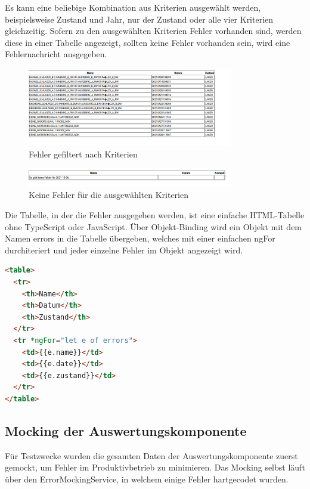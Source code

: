Es kann eine beliebige Kombination aus Kriterien ausgewählt werden, beispielsweise Zustand und Jahr, nur der Zustand oder alle vier 
Kriterien gleichzeitig. Sofern zu den ausgewählten Kriterien Fehler vorhanden sind, werden diese in einer Tabelle angezeigt, sollten 
keine Fehler vorhanden sein, wird eine Fehlernachricht ausgegeben.
\begin{figure}[H]
    \centering
    \includegraphics[width=0.80\textwidth]{pics/errors.PNG}
    \caption{Fehler gefiltert nach Kriterien}
    \label{fig:errors}
\end{figure}
\begin{figure}[H]
    \centering
    \includegraphics[width=0.80\textwidth]{pics/noerror.PNG}
    \caption{Keine Fehler für die ausgewählten Kriterien}
    \label{fig:noerrors}
\end{figure}

Die Tabelle, in der die Fehler ausgegeben werden, ist eine einfache HTML-Tabelle ohne TypeScript oder JavaScript. Über Objekt-Binding 
wird ein Objekt mit dem Namen errors in die Tabelle übergeben, welches mit einer einfachen ngFor durchiteriert und jeder einzelne Fehler
im Objekt angezeigt wird.

\begin{lstlisting}[language=HTML, caption={HTML-Code der Fehlertabelle}]
<table>
  <tr>
    <th>Name</th>
    <th>Datum</th>
    <th>Zustand</th>
  </tr>
  <tr *ngFor="let e of errors">
    <td>{{e.name}}</td>
    <td>{{e.date}}</td>
    <td>{{e.zustand}}</td>
  </tr>
</table>
\end{lstlisting}

\subsection{Mocking der Auswertungskomponente}
Für Testzwecke wurden die gesamten Daten der Auswertungskomponente zuerst gemockt, um Fehler im Produktivbetrieb zu minimieren.
Das Mocking selbst läuft über den ErrorMockingService, in welchem einige Fehler hartgecodet wurden.

